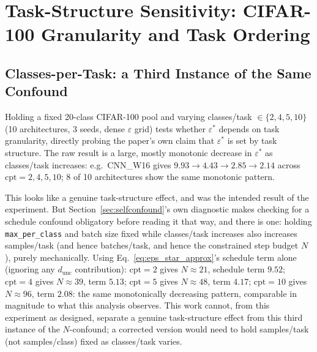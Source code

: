 \documentclass[11pt]{article}
\newcommand{\eps}{\varepsilon}
\newcommand{\epsstar}{\eps^{*}}
\begin{document}
\section{Task-Structure Sensitivity: CIFAR-100 Granularity and Task Ordering}
\label{sec:taskstructure}

\subsection{Classes-per-Task: a Third Instance of the Same Confound}
\label{sec:granularityconfound}
Holding a fixed 20-class CIFAR-100 pool and varying classes/task
$\in\{2,4,5,10\}$ (10 architectures, 3 seeds, dense $\eps$ grid) tests
whether $\epsstar$ depends on task granularity, directly probing the
paper's own claim that $\epsstar$ is set by task structure. The raw result
is a large, mostly monotonic decrease in $\epsstar$ as classes/task
increases: e.g.\ CNN\_W16 gives $9.93\to4.43\to2.85\to2.14$ across
$\text{cpt}=2,4,5,10$; 8 of 10 architectures show the same monotonic
pattern.

This looks like a genuine task-structure effect, and was the intended
result of the experiment. But Section~\ref{sec:selfconfound}'s own
diagnostic makes checking for a schedule confound obligatory before reading it
that way, and there is one: holding \texttt{max\_per\_class} and batch size
fixed while classes/task increases also increases samples/task
(and hence batches/task, and hence the constrained step budget $N$), purely
mechanically. Using Eq.~\ref{eq:eps_star_approx}'s schedule term alone
(ignoring any $d_{\mathrm{unc}}$ contribution): $\text{cpt}=2$ gives
$N\approx21$, schedule term $9.52$; $\text{cpt}=4$ gives $N\approx39$, term
$5.13$; $\text{cpt}=5$ gives $N\approx48$, term $4.17$; $\text{cpt}=10$
gives $N\approx96$, term $2.08$: the same monotonically decreasing
pattern, comparable in magnitude to what this analysis observes. This work cannot, from this
experiment as designed, separate a genuine task-structure effect from this
third instance of the $N$-confound; a corrected version would need to hold
samples/task (not samples/class) fixed as classes/task varies.
\end{document}
